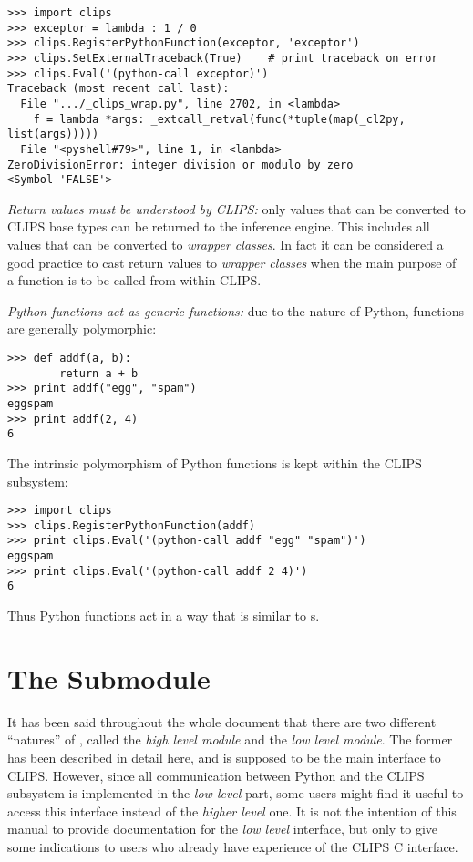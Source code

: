 \begin{verbatim}
>>> import clips
>>> exceptor = lambda : 1 / 0
>>> clips.RegisterPythonFunction(exceptor, 'exceptor')
>>> clips.SetExternalTraceback(True)	# print traceback on error
>>> clips.Eval('(python-call exceptor)')
Traceback (most recent call last):
  File ".../_clips_wrap.py", line 2702, in <lambda>
    f = lambda *args: _extcall_retval(func(*tuple(map(_cl2py, list(args)))))
  File "<pyshell#79>", line 1, in <lambda>
ZeroDivisionError: integer division or modulo by zero
<Symbol 'FALSE'>
\end{verbatim}

\emph{Return values must be understood by CLIPS:} only values that can
be converted to CLIPS base types can be returned to the inference engine.
This includes all values that can be converted to \pyclips{} \emph{wrapper
classes}. In fact it can be considered a good practice to cast return
values to \pyclips{} \emph{wrapper classes} when the main purpose of a
function is to be called from within CLIPS.

\emph{Python functions act as generic functions:} due to the nature of
Python, functions are generally polymorphic:

\begin{verbatim}
>>> def addf(a, b):
        return a + b
>>> print addf("egg", "spam")
eggspam
>>> print addf(2, 4)
6
\end{verbatim}

The intrinsic polymorphism of Python functions is kept within the CLIPS
subsystem:

\begin{verbatim}
>>> import clips
>>> clips.RegisterPythonFunction(addf)
>>> print clips.Eval('(python-call addf "egg" "spam")')
eggspam
>>> print clips.Eval('(python-call addf 2 4)')
6
\end{verbatim}

Thus Python functions act in a way that is similar to s.



\chapter{The  Submodule\label{pyclips-llclips}}

It has been said throughout the whole document that there are two
different ``natures'' of \pyclips{}, called the \emph{high level module}
and the \emph{low level module}. The former has been described in detail
here, and is supposed to be the main interface to CLIPS. However, since
all communication between Python and the CLIPS subsystem is implemented
in the \emph{low level} part, some users might find it useful to access
this interface instead of the \emph{higher level} one. It is not the
intention of this manual to provide documentation for the \emph{low
level}  interface, but only to give some indications
to users who already have experience of the CLIPS C interface.

